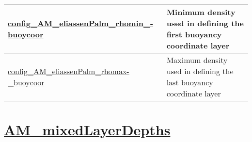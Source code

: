 {\begin{center}
\begin{longtable}{| p{2.0in} || p{4.0in} |}
    \hline
    \hyperref[subsec:nm_sec_config_AM_eliassenPalm_rhomin_buoycoor]{config\_AM\_eliassenPalm\_rhomin\_-}\hyperref[subsec:nm_sec_config_AM_eliassenPalm_rhomin_buoycoor]{buoycoor}& Minimum density used in defining the first buoyancy coordinate layer \\
    \hline
    \hyperref[subsec:nm_sec_config_AM_eliassenPalm_rhomax_buoycoor]{config\_AM\_eliassenPalm\_rhomax-}\hyperref[subsec:nm_sec_config_AM_eliassenPalm_rhomax_buoycoor]{\_buoycoor}& Maximum density used in defining the last buoyancy coordinate layer \\
    \hline
\end{longtable}
\end{center}
}
\section[AM\_mixedLayerDepths]{\hyperref[sec:nm_sec_AM_mixedLayerDepths]{AM\_mixedLayerDepths}}
\label{sec:nm_tab_AM_mixedLayerDepths}
\vspace{0.5in}
